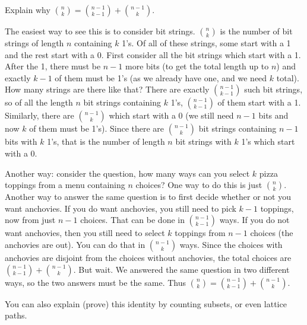 \documentclass[12pt]{article}
\begin{document}
\begin{example}
  Explain why ${n \choose k} = {n-1 \choose k-1} + {n-1 \choose k}$.
  \begin{solution}
    The easiest way to see this is to consider bit strings.  ${n \choose k}$ is the number of bit strings of length $n$ containing $k$ 1's.  Of all of these strings, some start with a 1 and the rest start with a 0.  First consider all the bit strings which start with a 1.  After the 1, there must be $n-1$ more bits (to get the total length up to $n$) and exactly $k-1$ of them must be 1's (as we already have one, and we need $k$ total).  How many strings are there like that?  There are exactly ${n-1 \choose k-1}$ such bit strings, so of all the length $n$ bit strings containing $k$ 1's, ${n-1 \choose k-1}$ of them start with a 1.  Similarly, there are ${n-1\choose k}$ which start with a 0 (we still need $n-1$ bits and now $k$ of them must be 1's).  Since there are ${n-1 \choose k}$ bit strings containing $n-1$ bits with $k$ 1's, that is the number of length $n$ bit strings with $k$ 1's which start with a 0.
    
    Another way: consider the question, how many ways can you select $k$ pizza toppings from a menu containing $n$ choices?  One way to do this is just ${n \choose k}$.  Another way to answer the same question is to first decide whether or not you want anchovies.  If you do want anchovies, you still need to pick $k-1$ toppings, now from just $n-1$ choices.  That can be done in ${n-1 \choose k-1}$ ways.  If you do not want anchovies, then you still need to select $k$ toppings from $n-1$ choices (the anchovies are out).  You can do that in ${n-1 \choose k}$ ways.  Since the choices with anchovies are disjoint from the choices without anchovies, the total choices are ${n-1 \choose k-1}+{n-1 \choose k}$.  But wait.  We answered the same question in two different ways, so the two answers must be the same.  Thus ${n \choose k} = {n-1\choose k-1} + {n-1 \choose k}$.
    
    You can also explain (prove) this identity by counting subsets, or even lattice paths.
  \end{solution}

\end{example}
\end{document}
